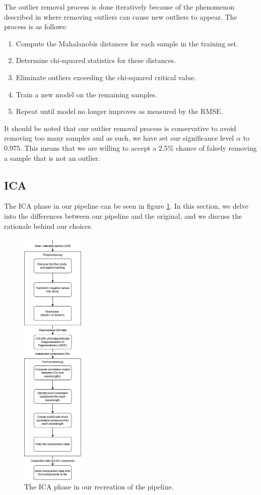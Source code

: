 The outlier removal process is done iteratively because of the phenomenon described in \citet{cleggRecalibrationMarsScience2017} where removing outliers can cause new outliers to appear.
The process is as follows:
\begin{enumerate}
    \item Compute the Mahalanobis distances for each sample in the training set.
    \item Determine chi-squared statistics for these distances.
    \item Eliminate outliers exceeding the chi-squared critical value.
    \item Train a new model on the remaining samples.
    \item Repeat until model no longer improves as measured by the RMSE.
\end{enumerate}

It should be noted that our outlier removal process is conservative to avoid removing too many samples and as such, we have set our significance level $\alpha$ to 0.975.
This means that we are willing to accept a 2.5\% chance of falsely removing a sample that is not an outlier.

\subsection{ICA}\label{sec:methodology_ica}
The ICA phase in our pipeline can be seen in figure \ref{fig:ica_phase}.
In this section, we delve into the differences between our pipeline and the original, and we discuss the rationale behind our choices.

\begin{figure}
	\centering
	\includegraphics[width=0.2675\textwidth]{images/ica_phase.png}
	\caption{The ICA phase in our recreation of the pipeline.}
	\label{fig:ica_phase}
\end{figure}

